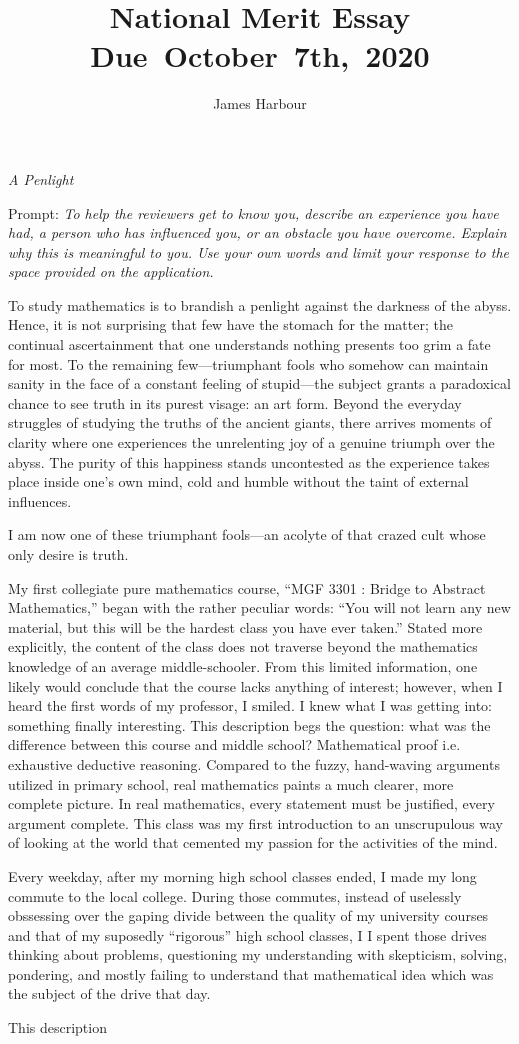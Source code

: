 \documentclass[12pt]{article}
\title{
    \vspace{2in}
    \textmd{\textbf{National Merit Essay}}\\
    \normalsize\vspace{0.1in}\small{Due\ October\ 7th,\ 2020}\\
    \vspace{3in}
}
\author{James Harbour}
\begin{document}
\maketitle
\pagebreak
 \begin{center}
   \emph{A Penlight}
 \end{center}
 Prompt: \emph{To help the reviewers get to know you, describe an experience you have had, a person who has influenced you, or an obstacle you have overcome. Explain why this is meaningful to you. Use your own words and limit your response to the space provided on the application.}
\raggedright\setlength{\parindent}{0.5in}

To study mathematics is to brandish a penlight against the darkness of the abyss. Hence, it is not surprising that few have the stomach for the matter; the continual ascertainment that one understands nothing presents too grim a fate for most. To the remaining few---triumphant fools who somehow can maintain sanity in the face of a constant feeling of stupid---the subject grants a paradoxical chance to see truth in its purest visage: an art form. Beyond the everyday struggles of studying the truths of the ancient giants, there arrives moments of clarity where one experiences the unrelenting joy of a genuine triumph over the abyss. The purity of this happiness stands uncontested as the experience takes place inside one's own mind, cold and humble without the taint of external influences.

I am now one of these triumphant fools---an acolyte of that crazed cult whose only desire is truth.

My first collegiate pure mathematics course, ``MGF 3301 : Bridge to Abstract Mathematics,'' began with the rather peculiar words: ``You will not learn any new material, but this will be the hardest class you have ever taken.'' Stated more explicitly, the content of the class does not traverse beyond the mathematics knowledge of an average middle-schooler. From this limited information, one likely would conclude that the course lacks anything of interest; however, when I heard the first words of my professor, I smiled. I knew what I was getting into: something finally interesting. This description begs the question: what was the difference between this course and middle school? Mathematical proof i.e. exhaustive deductive reasoning. Compared to the fuzzy, hand-waving arguments utilized in primary school, real mathematics paints a much clearer, more complete picture. In real mathematics, every statement must be justified, every argument complete. This class was my first introduction to an unscrupulous way of looking at the world that cemented my passion for the activities of the mind.

Every weekday, after my morning high school classes ended, I made my long commute to the local college. During those commutes, instead of uselessly obssessing over the gaping divide between the quality of my university courses and that of my suposedly ``rigorous'' high school classes, I
I spent those drives thinking about problems, questioning my understanding with skepticism, solving, pondering, and mostly failing to understand that mathematical idea which was the subject of the drive that day.


This description
\end{document}

